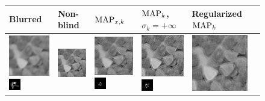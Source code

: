     \begin{figure}
    \centering
    \begin{tabular}{|l|l|l|l|l|l|}
 \hline 
Blurred & Non-blind & $\operatorname{MAP}_{x,k}$ & $\operatorname{MAP}_k$, $\sigma_k=+\infty$ & Regularized $\operatorname{MAP}_k$ \\ 
 \hline 
\includegraphics[width=2.5cm]{results/candy_kernel1_blurred.png}
\includegraphics[width=0.5cm]{images/kernel1}
& \includegraphics[width=2.5cm]{results/candy_kernel1_nonblind_deconv.png}
&\includegraphics[width=2.5cm]{results/candy_kernel1_MAPxk_x.png}
\includegraphics[width=0.5cm]{results/candy_kernel1_MAPxk_k.png}
&\includegraphics[width=2.5cm]{results/candy_kernel1_MAPk_x.png}
\includegraphics[width=0.5cm]{results/candy_kernel1_MAPk_k.png}
&\includegraphics[width=2.5cm]{results/candy_kernel1_MAPkreg_x.png}

\end{tabular}
\end{figure}
